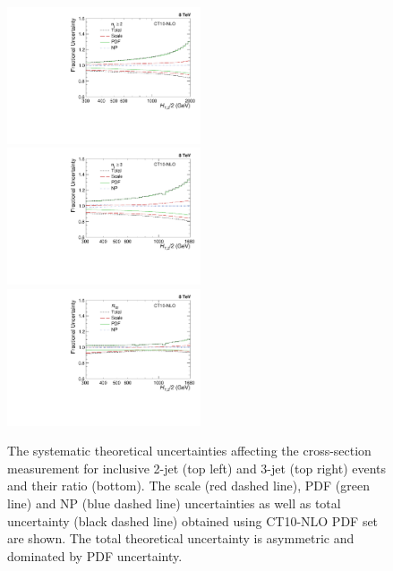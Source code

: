 \begin{figure}[!h]
 \begin{center}
 \hspace*{-5mm}\includegraphics[width=0.51\textwidth]{Plots_HT_2_150/Theory_Unc_2.pdf}%
 ~~\includegraphics[width=0.51\textwidth]{Plots_HT_2_150/Theory_Unc_3.pdf}\\
 \includegraphics[width=0.51\textwidth]{Plots_HT_2_150/Theory_Unc_Ratio_32.pdf}\\
 \caption[The systematic theoretical uncertainties affecting the cross-section measurement and the cross-section ratio.]{The systematic theoretical uncertainties affecting the cross-section measurement for inclusive 2-jet (top left) and 3-jet (top right) events and their ratio \ratio (bottom). The scale (red dashed line), PDF (green line) and NP (blue dashed line) uncertainties as well as total uncertainty (black dashed line) obtained using CT10-NLO PDF set are shown. The total theoretical uncertainty is asymmetric and dominated by PDF uncertainty.}
 \label{fig:theory_unc}
 \end{center}

\end{figure}
